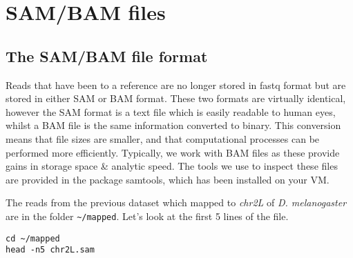 \chapter{SAM/BAM files}

\section{The SAM/BAM file format}
\begin{information}
Reads that have been to a reference are no longer stored in fastq format but are stored in either SAM or BAM format.
These two formats are virtually identical, however the SAM format is a text file which is easily readable to human eyes, whilst a BAM file is the same information converted to binary.
This conversion means that file sizes are smaller, and that computational processes can be performed more efficiently.
Typically, we work with BAM files as these provide gains in storage space \& analytic speed.
The tools we use to inspect these files are provided in the package samtools, which has been installed on your VM. \\
\end{information}

\begin{steps}
The reads from the previous dataset which mapped to \textit{chr2L} of \textit{D. melanogaster} are in the folder \texttt{\~{}/mapped}.
Let's look at the first 5 lines of the file.
\begin{lstlisting}
cd ~/mapped
head -n5 chr2L.sam  
\end{lstlisting}
\end{steps}

